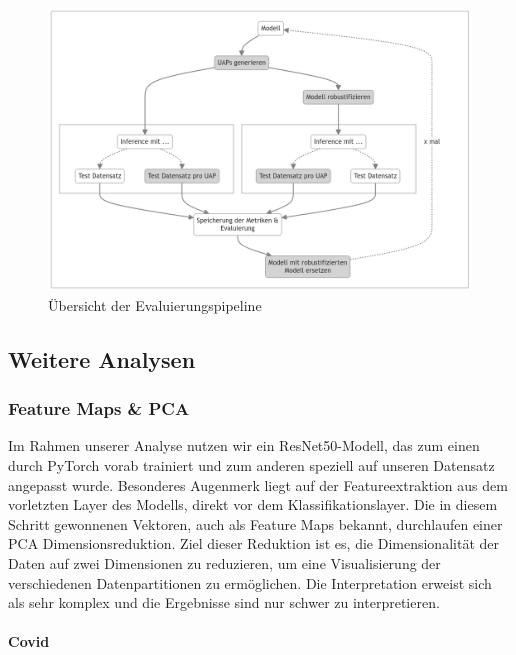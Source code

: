 \begin{figure}[H]
    \centering
    \includegraphics[width=\linewidth]{01-images/04-methodik/robustifizierungs-pipeline.png}
    \caption{Übersicht der Evaluierungspipeline}
    \label{fig:Evaluierungspipeline}
\end{figure}

\newpage

\subsection*{Weitere Analysen}

\subsubsection*{Feature Maps \& PCA} \label{chap:FeatureMaps-TestProblemEda3-mri}

Im Rahmen unserer Analyse nutzen wir ein ResNet50-Modell, das zum einen durch PyTorch vorab trainiert und zum anderen speziell auf unseren Datensatz angepasst wurde. Besonderes Augenmerk liegt auf der Featureextraktion aus dem vorletzten Layer des Modells, direkt vor dem Klassifikationslayer. Die in diesem Schritt gewonnenen Vektoren, auch als Feature Maps bekannt, durchlaufen einer PCA Dimensionsreduktion. Ziel dieser Reduktion ist es, die Dimensionalität der Daten auf zwei Dimensionen zu reduzieren, um eine Visualisierung der verschiedenen Datenpartitionen zu ermöglichen. Die Interpretation erweist sich als sehr komplex und die Ergebnisse sind nur schwer zu interpretieren. 

\paragraph*{Covid}

